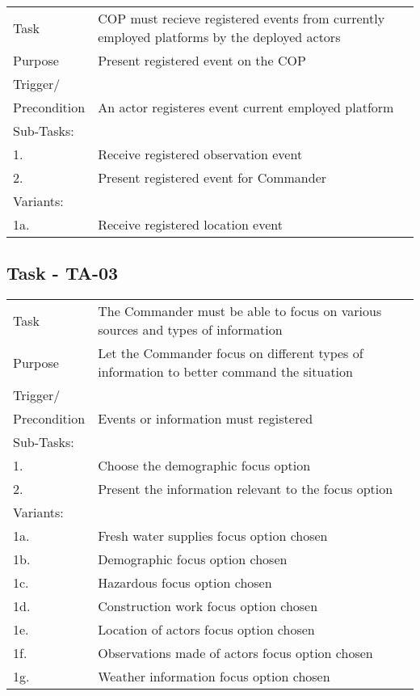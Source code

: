 \begin{longtable}{| p{2.5cm}  | p{10cm} |  }
	\hline
	Task & COP must recieve registered events from currently employed platforms by the deployed actors  \\
	Purpose & Present registered event on the COP \\
	Trigger/ &  \\Precondition & An actor registeres event current employed platform \\
	\hline
	Sub-Tasks: & \\
	1. & Receive registered observation event \\
	2. & Present registered event for Commander \\
	\hline
	Variants: & \\
	1a. & Receive registered location event \\
	\hline
\end{longtable}

\subsection{Task - TA-03}
\begin{longtable}{| p{2.5cm}  | p{10cm} |  }
	\hline
	Task & The Commander must be able to focus on various sources and types of information  \\
	Purpose & Let the Commander focus on different types of information to better command the situation \\
	Trigger/ &  \\ Precondition & Events or information must registered \\
	\hline
	Sub-Tasks: & \\
	1. & Choose the demographic focus option \\
	2. & Present the information relevant to the focus option \\
	\hline
	Variants: & \\
	1a. & Fresh water supplies focus option chosen \\
	1b. & Demographic focus option chosen \\
	1c. & Hazardous focus option chosen \\
	1d. & Construction work focus option chosen \\
	1e. & Location of actors focus option chosen \\
	1f. & Observations made of actors focus option chosen \\
	1g. & Weather information focus option chosen \\
	\hline
\end{longtable}

